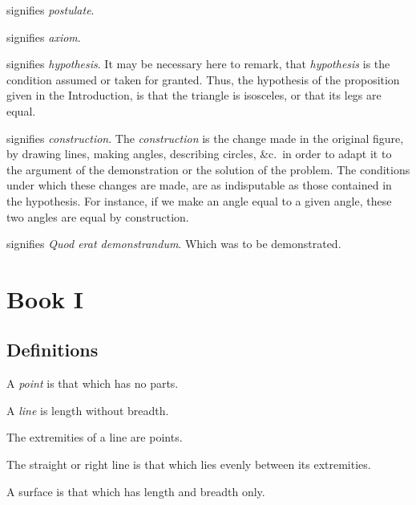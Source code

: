 \documentclass[booklanguage=english]{byrnebook}
\begin{document}
\symb{\inpoststr}
 signifies \emph{postulate}.

\symb{\inaxstr}
 signifies \emph{axiom}.

 signifies \emph{hypothesis}. It may be necessary here to remark, that \emph{hypothesis} is the condition assumed or taken for granted. Thus, the hypothesis of the proposition given in the Introduction, is that the triangle is isosceles, or that its legs are equal.

\symb{\conststr}
 signifies \emph{construction}. The \emph{construction} is the change made in the original figure, by drawing lines, making angles, describing circles, \&c.\ in order to adapt it to the argument of the demonstration or the solution of the problem. The conditions under which these changes are made, are as indisputable as those contained in the hypothesis. For instance, if we make an angle equal to a given angle, these two angles are equal by construction.

\symb{\qedstr}
signifies \emph{Quod erat demonstrandum}. Which was to be demonstrated.

\part{Book I}

\chapter*{Definitions}

\startdefinition{}\label{def:I.I}
\begin{center}
A \emph{point} is that which has no parts.
\end{center}

\startdefinition{}\label{def:I.II}
\begin{center}
A \emph{line} is length without breadth.
\end{center}

\startdefinition{}\label{def:I.III}
\begin{center}
The extremities of a line are points.
\end{center}

\startdefinition{}\label{def:I.IV}
\begin{center}
The straight or right line is that which lies evenly between its extremities.
\end{center}

\startdefinition{}\label{def:I.V}
\begin{center}
A surface is that which has length and breadth only.
\end{center}
\end{document}
